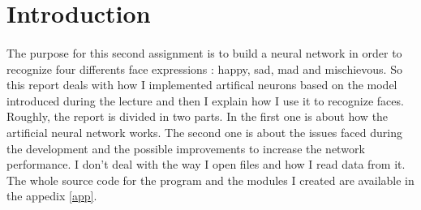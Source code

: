 \section*{Introduction}

    \paragraph{}{
        The purpose for this second assignment is to build a neural network in
     order to recognize four differents face expressions : happy, sad, mad and 
     mischievous. So this report deals with how I implemented artifical neurons
     based on the model introduced during the lecture and then I explain how I 
     use it to recognize faces. Roughly, the report is divided in two parts. 
     In the first one is about how the artificial neural network works. The
     second one is about the issues faced during the development and the 
     possible improvements to increase the network performance. \newline
     I don't deal with the way I open files and how I read data from it. The 
     whole source code for the program and the modules I created are available 
     in the appedix \ref{app}.
    }
